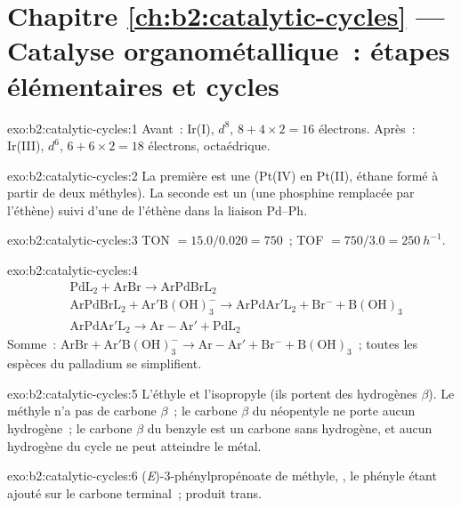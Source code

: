 \section*{Chapitre \ref{ch:b2:catalytic-cycles} --- Catalyse organométallique~: étapes élémentaires et cycles}

\begin{solution}{exo:b2:catalytic-cycles:1}
Avant~: Ir(I), $d^8$, $8 + 4 \times 2 = 16$ électrons. Après~: Ir(III), $d^6$, $6 + 6 \times 2 = 18$
électrons, octaédrique.
\end{solution}

\begin{solution}{exo:b2:catalytic-cycles:2}
La première est une  (Pt(IV) en Pt(II), éthane formé à partir de deux méthyles).
La seconde est un  (une phosphine remplacée par l'éthène) suivi d'une
 de l'éthène dans la liaison Pd--Ph.
\end{solution}

\begin{solution}{exo:b2:catalytic-cycles:3}
TON $= 15.0/0.020 = 750$~; TOF $= 750/3.0 = \qty{250}{h^{-1}}$.
\end{solution}

\begin{solution}{exo:b2:catalytic-cycles:4}
\begin{align*}
  &\mathrm{PdL_2 + ArBr \to ArPdBrL_2}\\
  &\mathrm{ArPdBrL_2 + Ar'B(OH)_3^- \to ArPdAr'L_2 + Br^- + B(OH)_3}\\
  &\mathrm{ArPdAr'L_2 \to Ar{-}Ar' + PdL_2}
\end{align*}
Somme~: $\mathrm{ArBr + Ar'B(OH)_3^- \to Ar{-}Ar' + Br^- + B(OH)_3}$~; toutes les espèces du palladium
se simplifient.
\end{solution}

\begin{solution}{exo:b2:catalytic-cycles:5}
L'éthyle et l'isopropyle (ils portent des hydrogènes $\beta$). Le méthyle n'a pas de carbone $\beta$~; le carbone $\beta$
du néopentyle ne porte aucun hydrogène~; le carbone $\beta$ du benzyle est un carbone  sans hydrogène, et aucun hydrogène du cycle ne peut atteindre
le métal.
\end{solution}

\begin{solution}{exo:b2:catalytic-cycles:6}
(\textit{E})-3-phénylpropénoate de méthyle, , le phényle étant ajouté sur le
carbone terminal~; produit trans.
\end{solution}

